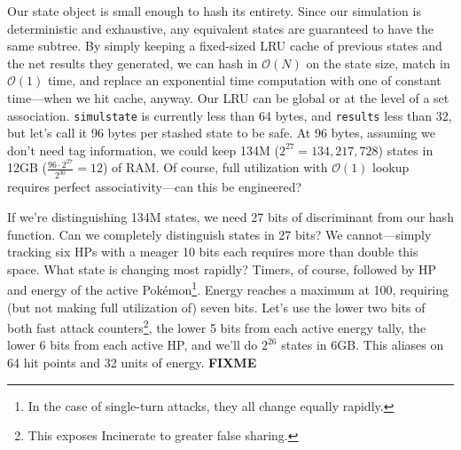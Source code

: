 Our state object is small enough to hash its entirety.
Since our simulation is deterministic and exhaustive, any equivalent states
 are guaranteed to have the same subtree.
By simply keeping a fixed-sized LRU cache of previous states and the net results they
 generated, we can hash in $\mathcal{O}(N)$ on the state size, match in $\mathcal{O}(1)$
 time, and replace an exponential time computation with one of constant time---when we hit cache, anyway.
Our LRU can be global or at the level of a set association.
\texttt{simulstate} is currently less than 64 bytes, and \texttt{results} less than 32, but
 let's call it 96 bytes per stashed state to be safe.
At 96 bytes, assuming we don't need tag information, we could keep 134M ($2^{27} = 134,217,728$) states
 in 12GB ($\frac{96\cdot2^{27}}{2^{30}} = 12$) of RAM\@.
Of course, full utilization with $\mathcal{O}(1)$ lookup requires perfect associativity---can this
 be engineered?

If we're distinguishing 134M states, we need 27 bits of discriminant from our hash function.
Can we completely distinguish states in 27 bits?
We cannot---simply tracking six HPs with a meager 10 bits each requires more than double this space.
What state is changing most rapidly?
Timers, of course, followed by HP and energy of the active Pokémon\footnote{In the case of single-turn attacks, they all change equally rapidly.}.
Energy reaches a maximum at 100, requiring (but not making full utilization of) seven bits.
Let's use the lower two bits of both fast attack counters\footnote{This exposes Incinerate to greater false sharing.},
 the lower 5 bits from each active energy tally, the lower 6 bits from each
 active HP, and we'll do $2^{26}$ states in 6GB\@.
This aliases on 64 hit points and 32 units of energy.
\textbf{FIXME}

